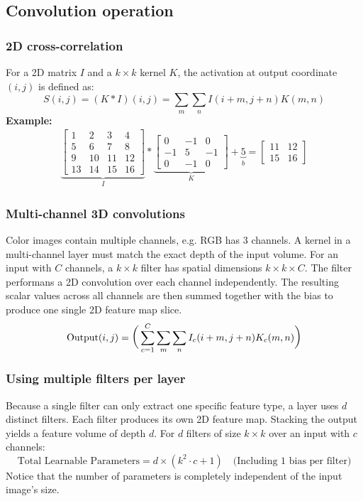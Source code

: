 \documentclass[11pt]{article}
\begin{document}
\subsection{Convolution operation}
\subsubsection{2D cross-correlation}
For a 2D matrix $I$ and a $k\times k$ kernel $K$, the activation at output coordinate $(i,j)$ is defined as:
$$
S(i,j)=(K\ast I)(i,j)=\sum_m\sum_nI(i+m,j+n)K(m,n)
$$
\textbf{Example:}
\begin{align*}
\underbrace{\begin{bmatrix}
1 & 2 & 3 & 4 \\
5 & 6 & 7 & 8 \\
9 & 10 & 11 & 12 \\
13 & 14 & 15 & 16
\end{bmatrix}}_I
\ast
\underbrace{\begin{bmatrix}
0 & -1 & 0 \\
-1 & 5 & -1 \\
0 & -1 & 0
\end{bmatrix}}_K
+\underbrace{5}_b
=\begin{bmatrix}
11 & 12 \\
15 & 16
\end{bmatrix}
\end{align*}
\subsubsection{Multi-channel 3D convolutions}
Color images contain multiple channels, e.g. RGB has 3 channels. A kernel in a multi-channel layer must match the exact depth of the input volume.
For an input with $C$ channels, a $k\times k$ filter has spatial dimensions $k\times k\times C$. 
The filter performans a 2D convolution over each channel independently. The resulting scalar values across all channels are then summed together with the bias to produce one single 2D feature map slice.
$$
\text{Output}(i,j)=\Large\Big(\sum_{c=1}^C\sum_m\sum_nI_c(i+m,j+n)K_c(m,n)\Big)
$$
\subsubsection{Using multiple filters per layer}
Because a single filter can only extract one specific feature type, a layer uses $d$ distinct filters.
Each filter produces its own 2D feature map. Stacking the output yields a feature volume of depth $d$.
For $d$ filters of size $k\times k$ over an input with $c$ channels:
$$
\text{Total Learnable Parameters}=d\times(k^2\cdot c+1)\quad \text{(Including 1 bias per filter)}
$$
Notice that the number of parameters is completely independent of the input image's size.
\end{document}
